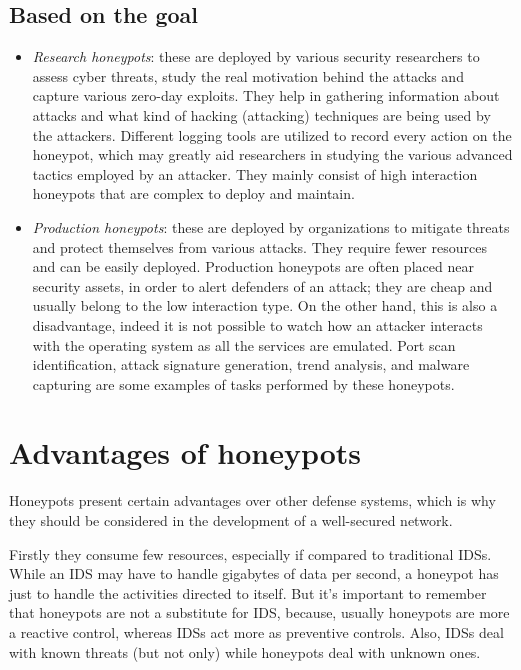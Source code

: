 \documentclass[epsfig,a4paper,11pt,titlepage,oneside,openany]{book}
\begin{document}
\section{Based on the goal}

\begin{itemize}
\item \textit{Research honeypots}: these are deployed by various security researchers to assess cyber threats, study the real motivation behind the attacks and capture various zero-day exploits. They help in gathering information about attacks and what kind of hacking (attacking) techniques are being used by the attackers. Different logging tools are utilized to record every action on the honeypot, which may greatly aid researchers in studying the various advanced tactics employed by an attacker. They mainly consist of high interaction honeypots that are complex to deploy and maintain.


\item \textit{Production honeypots}: these are deployed by organizations to mitigate threats and protect themselves from various attacks. They require fewer resources and can be easily deployed. Production honeypots are often placed near security assets, in order to alert defenders of an attack; they are cheap and usually belong to the low interaction type. On the other hand, this is also a disadvantage, indeed it is not possible to watch how an attacker interacts with the operating system as all the services are emulated. Port scan identification, attack signature generation, trend analysis, and malware capturing are some examples of tasks performed by these honeypots.


\end{itemize}

\chapter{Advantages of honeypots}
Honeypots present certain advantages over other defense systems, which is why they should be considered in the development of a well-secured network.

Firstly they consume few resources, especially if compared to traditional IDSs. While an IDS may have to handle gigabytes of data per second, a honeypot has just to handle the activities directed to itself. But it’s important to remember that honeypots are not a substitute for IDS, because, usually honeypots are more a reactive control, whereas IDSs act more as preventive controls. Also, IDSs deal with known threats (but not only) while honeypots deal with unknown ones.
\end{document}
